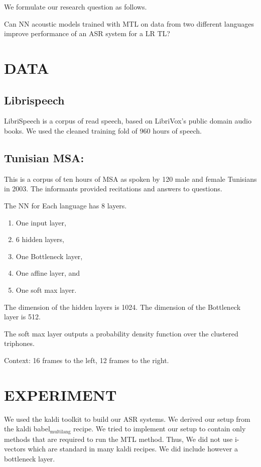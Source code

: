 \documentclass[11pt]{article}
\begin{document}
We formulate our research question as follows.

Can \gls{NN} acoustic models trained with \gls{MTL} on data  from  two different languages improve performance of an  \gls{ASR} system for a \gls{LR} \gls{TL}?

\section{DATA}
\label{sec-3}
\subsection{Librispeech}
\label{sec-3-1}
LibriSpeech is a corpus of read speech, based on LibriVox's public domain audio books. 
We used the cleaned training fold of 960 hours of speech. 

\subsection{Tunisian \gls{MSA}:}
\label{sec-3-2}
This is a corpus of ten hours of \gls{MSA} as spoken by 120 male and female Tunisians in 2003. 
The informants provided recitations and answers to questions. 


The \gls{NN} for Each language has 8 layers.

\begin{enumerate}
\item One input layer,
\item 6 hidden layers,
\item One Bottleneck layer,
\item One affine layer, and
\item One soft max layer.
\end{enumerate}

The dimension of the hidden layers is 1024.
The dimension of the Bottleneck layer is 512.

The soft max layer outputs a probability density function over the clustered triphones.

Context:
16 frames to the left, 12 frames to the right.

\section{EXPERIMENT}
\label{sec-4}
We used the kaldi toolkit\cite{Povey11thekaldi} to build our ASR systems. 
We derived our setup from the kaldi babel$_{\text{multilang}}$ recipe. 
We tried to implement our setup to contain only methods that are required to run the \gls{MTL} method. 
Thus, We did not use i-vectors which are standard in many kaldi recipes. 
We did include however a bottleneck layer. 
\end{document}
